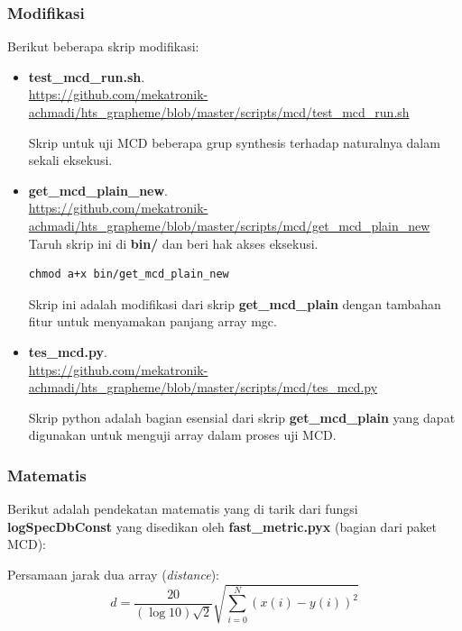 \documentclass[12pt,]{article}
\begin{document}
	\newpage
	\subsubsection{Modifikasi}

	Berikut beberapa skrip modifikasi:
	\begin{itemize}
		\item \textbf{test\_mcd\_run.sh}.\\
		\url{https://github.com/mekatronik-achmadi/hts_grapheme/blob/master/scripts/mcd/test_mcd_run.sh}

		Skrip untuk uji MCD beberapa grup synthesis terhadap naturalnya dalam sekali eksekusi.

		\item \textbf{get\_mcd\_plain\_new}.\\
		\url{https://github.com/mekatronik-achmadi/hts_grapheme/blob/master/scripts/mcd/get_mcd_plain_new}
		Taruh skrip ini di \textbf{bin/} dan beri hak akses eksekusi.

		\begin{verbatim}
chmod a+x bin/get_mcd_plain_new
		\end{verbatim}

		Skrip ini adalah modifikasi dari skrip \textbf{get\_mcd\_plain} dengan tambahan fitur untuk menyamakan panjang array mgc.

		\item \textbf{tes\_mcd.py}.\\
		\url{https://github.com/mekatronik-achmadi/hts_grapheme/blob/master/scripts/mcd/tes_mcd.py}

		Skrip python adalah bagian esensial dari skrip \textbf{get\_mcd\_plain} yang dapat digunakan untuk menguji array dalam proses uji MCD.

	\end{itemize}

	\subsubsection{Matematis}

	Berikut adalah pendekatan matematis yang di tarik dari fungsi \textbf{logSpecDbConst} yang disedikan oleh \textbf{fast\_metric.pyx} (bagian dari paket MCD):

	Persamaan jarak dua array (\textit{distance}):
	\begin{equation}
		d = \frac{20}{(\log{10})\sqrt{2}} \sqrt{ \sum_{i=0}^{N} ( x(i)-y(i) )^2 }
	\end{equation}
\end{document}
